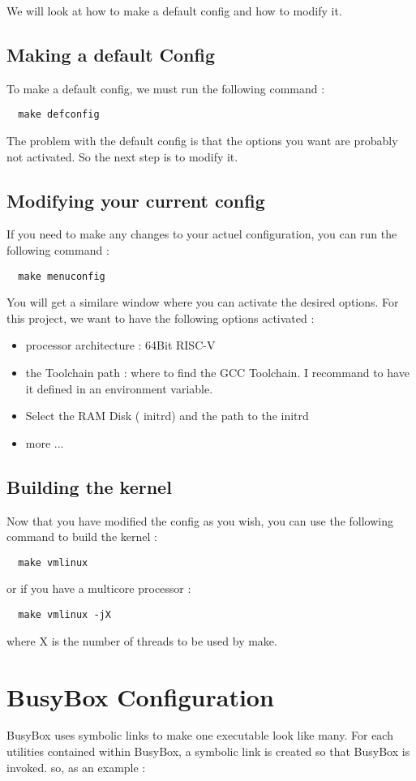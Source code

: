 \documentclass[a4paper,11pt]{report}
\begin{document}
We will look at how to make a default config and how to modify it.
\newpage

\subsection{Making a default Config}
To make a default config, we must run the following command :
\begin{lstlisting}
  make defconfig
\end{lstlisting}
The problem with the default config is that the options you want 
are probably not activated. So the next step is to modify it.

\subsection{Modifying your current config}
If you need to make any changes to your actuel configuration, you can run the following command :
\begin{lstlisting}
  make menuconfig
\end{lstlisting}
You will get a similare window where you can activate the desired options.
For this project, we want to have the following options activated :\begin{itemize}
  \item processor architecture : 64Bit RISC-V
  \item the Toolchain path : where to find the GCC Toolchain. I recommand to have it defined in an environment variable.
  \item Select the RAM Disk ( initrd)  and the path to the initrd
  \item more ...
\end{itemize}

\subsection{Building the kernel}
Now that you have modified the config as you wish, you can use the following
command to build the kernel :
\begin{lstlisting}
  make vmlinux
\end{lstlisting}
or if you have a multicore processor :
\begin{lstlisting}
  make vmlinux -jX
\end{lstlisting}
where X is the number of threads to be used by make.
\section{BusyBox Configuration}
BusyBox uses symbolic links to make one executable look like many.
For each utilities contained within BusyBox, a symbolic link is created
so that BusyBox is invoked.
so, as an example : 
\end{document}
